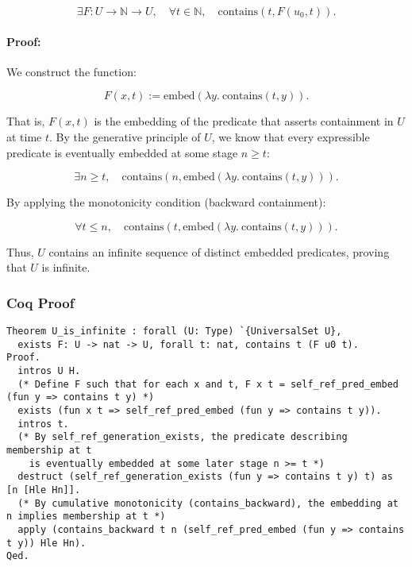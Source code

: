 \documentclass[12pt]{article}
\begin{document}
\begin{equation}
    \exists F: U \to \mathbb{N} \to U, \quad \forall t \in \mathbb{N}, \quad \text{contains}(t, F(u_0, t)).
\end{equation}

\paragraph{Proof:}
We construct the function:

\begin{equation}
    F(x, t) := \text{embed}(\lambda y.\ \text{contains}(t, y)).
\end{equation}

That is, \( F(x, t) \) is the embedding of the predicate that asserts containment in \( U \) at time \( t \). By the generative principle of \( U \), we know that every expressible predicate is eventually embedded at some stage \( n \geq t \):

\begin{equation}
    \exists n \geq t, \quad \text{contains}(n, \text{embed}(\lambda y.\ \text{contains}(t, y))).
\end{equation}

By applying the monotonicity condition (backward containment):

\begin{equation}
    \forall t \leq n, \quad \text{contains}(t, \text{embed}(\lambda y.\ \text{contains}(t, y))).
\end{equation}

Thus, \( U \) contains an infinite sequence of distinct embedded predicates, proving that \( U \) is infinite.

\subsubsection{Coq Proof}
\begin{lstlisting}[language=Coq]
Theorem U_is_infinite : forall (U: Type) `{UniversalSet U},
  exists F: U -> nat -> U, forall t: nat, contains t (F u0 t).
Proof.
  intros U H.
  (* Define F such that for each x and t, F x t = self_ref_pred_embed (fun y => contains t y) *)
  exists (fun x t => self_ref_pred_embed (fun y => contains t y)).
  intros t.
  (* By self_ref_generation_exists, the predicate describing membership at t
    is eventually embedded at some later stage n >= t *)
  destruct (self_ref_generation_exists (fun y => contains t y) t) as [n [Hle Hn]].
  (* By cumulative monotonicity (contains_backward), the embedding at n implies membership at t *)
  apply (contains_backward t n (self_ref_pred_embed (fun y => contains t y)) Hle Hn).
Qed.
\end{lstlisting}
\end{document}
